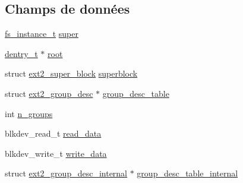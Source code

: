 \subsection*{Champs de données}
\begin{DoxyCompactItemize}
\item 
\hyperlink{vfs_8h_a0eefa9aac35a5462ebf1e038992ca860}{fs\-\_\-instance\-\_\-t} \hyperlink{struct__ext2__fs__instance__t_a456ee695fb1a0b71edadda9f4504ca2d}{super}
\item 
\hyperlink{vfs_8h_ade5c998c6b3f09d2cf45d0e5ef8787da}{dentry\-\_\-t} $\ast$ \hyperlink{struct__ext2__fs__instance__t_a52f883f2d709ab3b4dff94b5b7100973}{root}
\item 
struct \hyperlink{structext2__super__block}{ext2\-\_\-super\-\_\-block} \hyperlink{struct__ext2__fs__instance__t_a81ad8719743e20da6f661c2586b56ad2}{superblock}
\item 
struct \hyperlink{structext2__group__desc}{ext2\-\_\-group\-\_\-desc} $\ast$ \hyperlink{struct__ext2__fs__instance__t_acc01ef58cbc6cfa9d3ff4e08709a561a}{group\-\_\-desc\-\_\-table}
\item 
int \hyperlink{struct__ext2__fs__instance__t_a81a5e5b8f7d46d744c96a4f28317e59f}{n\-\_\-groups}
\item 
blkdev\-\_\-read\-\_\-t \hyperlink{struct__ext2__fs__instance__t_ac3ea85962b66914cb42ec884d70a853d}{read\-\_\-data}
\item 
blkdev\-\_\-write\-\_\-t \hyperlink{struct__ext2__fs__instance__t_a90d334c34e9aeea01be13fe1ed66ba7b}{write\-\_\-data}
\item 
struct \hyperlink{structext2__group__desc__internal}{ext2\-\_\-group\-\_\-desc\-\_\-internal} $\ast$ \hyperlink{struct__ext2__fs__instance__t_a9db69a1265be4c818005d18add117790}{group\-\_\-desc\-\_\-table\-\_\-internal}
\end{DoxyCompactItemize}


